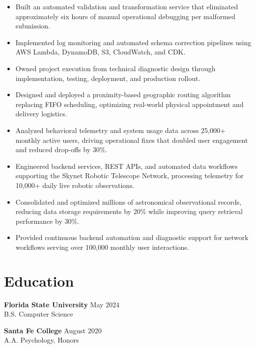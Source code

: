 \documentclass[10pt,letterpaper]{article}
\begin{document}
\vspace{3pt}


\begin{itemize}
\item Built an automated validation and transformation service that eliminated approximately six hours of manual operational debugging per malformed submission.
\item Implemented log monitoring and automated schema correction pipelines using AWS Lambda, DynamoDB, S3, CloudWatch, and CDK.
\item Owned project execution from technical diagnostic design through implementation, testing, deployment, and production rollout.
\end{itemize}

\vspace{3pt}


\begin{itemize}
\item Designed and deployed a proximity-based geographic routing algorithm replacing FIFO scheduling, optimizing real-world physical appointment and delivery logistics.
\item Analyzed behavioral telemetry and system usage data across 25,000+ monthly active users, driving operational fixes that doubled user engagement and reduced drop-offs by 30\%.
\end{itemize}

\vspace{3pt}


\begin{itemize}
\item Engineered backend services, REST APIs, and automated data workflows supporting the Skynet Robotic Telescope Network, processing telemetry for 10,000+ daily live robotic observations.
\item Consolidated and optimized millions of astronomical observational records, reducing data storage requirements by 20\% while improving query retrieval performance by 30\%.
\item Provided continuous backend automation and diagnostic support for network workflows serving over 100,000 monthly user interactions.
\end{itemize}

\section*{Education}

\textbf{Florida State University} \hfill May 2024 \\
B.S. Computer Science

\vspace{3pt}

\textbf{Santa Fe College} \hfill August 2020  \\
A.A. Psychology, Honors
\end{document}
